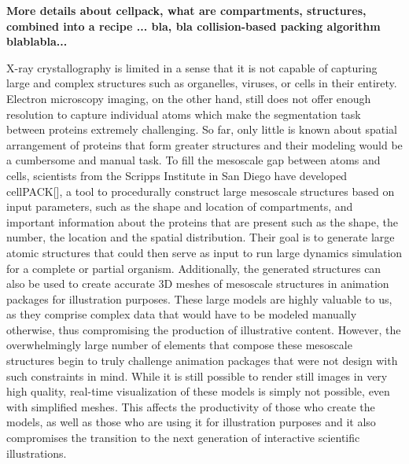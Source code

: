 \textbf{More details about cellpack,
what are compartments, structures, combined into a recipe ... bla, bla
collision-based packing algorithm blablabla...}



X-ray crystallography is limited in a sense that it is not capable of capturing large and complex structures such as organelles, viruses, or cells in their entirety.
Electron microscopy imaging, on the other hand, still does not offer enough resolution to capture individual atoms which make the segmentation task between proteins extremely challenging.
So far, only little is known about spatial arrangement of proteins that form greater structures and their modeling would be a cumbersome and manual task.
To fill the mesoscale gap between atoms and cells, scientists from the Scripps Institute in San Diego have developed cellPACK[], a tool to procedurally construct large mesoscale structures based on input parameters, such as the shape and location of compartments, and important information about the proteins that are present such as the shape, the number, the location and the spatial distribution.
Their goal is to generate large atomic structures that could then serve as input to run large dynamics simulation for a complete or partial organism.
Additionally, the generated structures can also be used to create accurate 3D meshes of mesoscale structures in animation packages for illustration purposes.
These large models are highly valuable to us, as they comprise complex data that would have to be modeled manually otherwise, thus compromising the production of illustrative content.
However, the overwhelmingly large number of elements that compose these mesoscale structures begin to truly challenge animation packages that were not design with such constraints in mind.
While it is still possible to render still images in very high quality, real-time visualization of these models is simply not possible, even with simplified meshes. 
This affects the productivity of those who create the models, as well as those who are using it for illustration purposes and it also compromises the transition to the next generation of interactive scientific illustrations.

